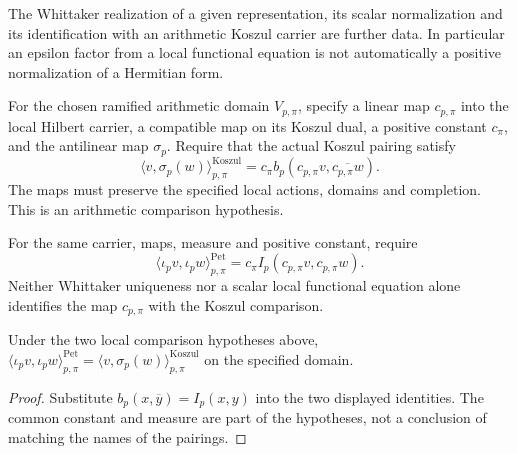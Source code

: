 The Whittaker realization of a given representation, its scalar
normalization and its identification with an arithmetic Koszul
carrier are further data. In particular an epsilon factor from a
local functional equation is not automatically a positive
normalization of a Hermitian form.

\begin{hypothesis}
\label{v4-arith:kms-gns:lem:Koszul-ramified}
For the chosen ramified arithmetic domain \(V_{p,\pi}\), specify a
linear map \(c_{p,\pi}\) into the local Hilbert carrier, a compatible
map on its Koszul dual, a positive constant \(c_\pi\), and the
antilinear map \(\sigma_p\). Require that the actual Koszul pairing
satisfy
\begin{equation}
\label{v4-arith:kms-gns:eq:Koszul-ramified}
 \langle v,\sigma_p(w)\rangle^{\mathrm{Koszul}}_{p,\pi}
 =c_\pi b_p(c_{p,\pi}v,\overline{c_{p,\pi}w}).
\end{equation}
The maps must preserve the specified local actions, domains and
completion. This is an arithmetic comparison hypothesis.
\end{hypothesis}

\begin{hypothesis}
\label{v4-arith:kms-gns:lem:Pet-ramified}
For the same carrier, maps, measure and positive constant, require
\begin{equation}
\label{v4-arith:kms-gns:eq:Pet-ramified}
 \langle\iota_p v,\iota_p w\rangle^{\mathrm{Pet}}_{p,\pi}
 =c_\pi I_p(c_{p,\pi}v,c_{p,\pi}w).
\end{equation}
Neither Whittaker uniqueness nor a scalar local functional equation
alone identifies the map \(c_{p,\pi}\) with the Koszul comparison.
\end{hypothesis}

\begin{proposition}
\label{v4-arith:kms-gns:prop:local-match-ramified}
Under the two local comparison hypotheses above,
\(\langle\iota_pv,\iota_pw\rangle^{\mathrm{Pet}}_{p,\pi}
=\langle v,\sigma_p(w)\rangle^{\mathrm{Koszul}}_{p,\pi}\)
on the specified domain.
\end{proposition}
\begin{proof}
Substitute \(b_p(x,\overline y)=I_p(x,y)\) into the two displayed
identities. The common constant and measure are part of the
hypotheses, not a conclusion of matching the names of the pairings.
\end{proof}

